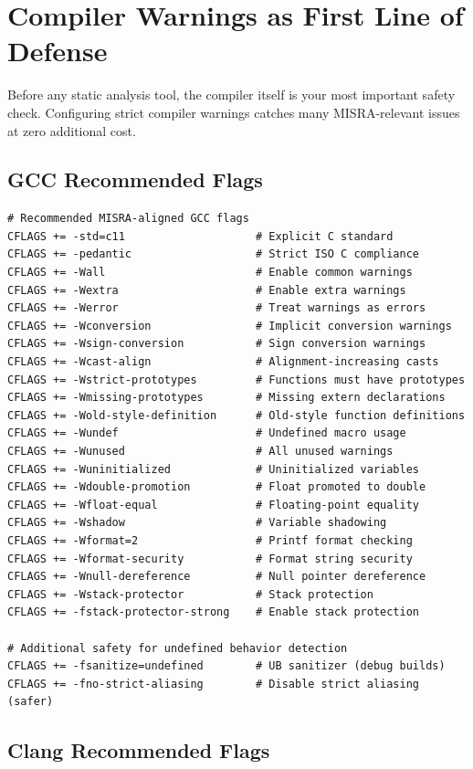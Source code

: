 \documentclass[11pt,letterpaper]{report}
\begin{document}
\chapter{Compiler Warnings as First Line of Defense}

Before any static analysis tool, the compiler itself is your most important safety check. Configuring strict compiler warnings catches many MISRA-relevant issues at zero additional cost.

\section{GCC Recommended Flags}

\begin{verbatim}
# Recommended MISRA-aligned GCC flags
CFLAGS += -std=c11                    # Explicit C standard
CFLAGS += -pedantic                   # Strict ISO C compliance
CFLAGS += -Wall                       # Enable common warnings
CFLAGS += -Wextra                     # Enable extra warnings
CFLAGS += -Werror                     # Treat warnings as errors
CFLAGS += -Wconversion                # Implicit conversion warnings
CFLAGS += -Wsign-conversion           # Sign conversion warnings
CFLAGS += -Wcast-align                # Alignment-increasing casts
CFLAGS += -Wstrict-prototypes         # Functions must have prototypes
CFLAGS += -Wmissing-prototypes        # Missing extern declarations
CFLAGS += -Wold-style-definition      # Old-style function definitions
CFLAGS += -Wundef                     # Undefined macro usage
CFLAGS += -Wunused                    # All unused warnings
CFLAGS += -Wuninitialized             # Uninitialized variables
CFLAGS += -Wdouble-promotion          # Float promoted to double
CFLAGS += -Wfloat-equal               # Floating-point equality
CFLAGS += -Wshadow                    # Variable shadowing
CFLAGS += -Wformat=2                  # Printf format checking
CFLAGS += -Wformat-security           # Format string security
CFLAGS += -Wnull-dereference          # Null pointer dereference
CFLAGS += -Wstack-protector           # Stack protection
CFLAGS += -fstack-protector-strong    # Enable stack protection

# Additional safety for undefined behavior detection
CFLAGS += -fsanitize=undefined        # UB sanitizer (debug builds)
CFLAGS += -fno-strict-aliasing        # Disable strict aliasing (safer)
\end{verbatim}

\section{Clang Recommended Flags}
\end{document}
